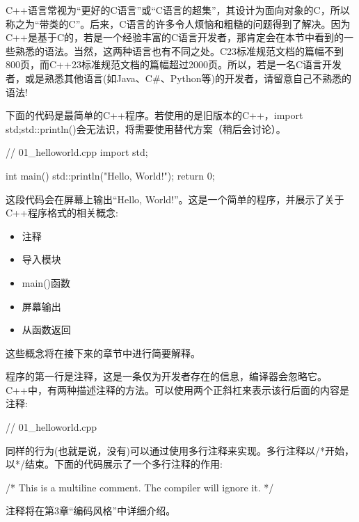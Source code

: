
C++语言常视为“更好的C语言”或“C语言的超集”，其设计为面向对象的C，所以称之为“带类的C”。后来，C语言的许多令人烦恼和粗糙的问题得到了解决。因为C++是基于C的，若是一个经验丰富的C语言开发者，那肯定会在本节中看到的一些熟悉的语法。当然，这两种语言也有不同之处。C23标准规范文档的篇幅不到800页，而C++23标准规范文档的篇幅超过2000页。所以，若是一名C语言开发者，或是熟悉其他语言(如Java、C\#、Python等)的开发者，请留意自己不熟悉的语法!


下面的代码是最简单的C++程序。若使用的是旧版本的C++，import  std;std::println()会无法识，将需要使用替代方案（稍后会讨论）。

\begin{cpp}
// 01_helloworld.cpp
import std;

int main()
{
    std::println("Hello, World!");
    return 0;
}
\end{cpp}

这段代码会在屏幕上输出“Hello, World!”。这是一个简单的程序，并展示了关于C++程序格式的相关概念:

\begin{itemize}
\item
注释

\item
导入模块

\item
main()函数

\item
屏幕输出

\item
从函数返回
\end{itemize}

这些概念将在接下来的章节中进行简要解释。


程序的第一行是注释，这是一条仅为开发者存在的信息，编译器会忽略它。C++中，有两种描述注释的方法。可以使用两个正斜杠来表示该行后面的内容是注释:

\begin{cpp}
// 01_helloworld.cpp
\end{cpp}

同样的行为(也就是说，没有)可以通过使用多行注释来实现。多行注释以/*开始，以*/结束。下面的代码展示了一个多行注释的作用:

\begin{cpp}
/* This is a multiline comment.
   The compiler will ignore it.
*/
\end{cpp}

注释将在第3章“编码风格”中详细介绍。

